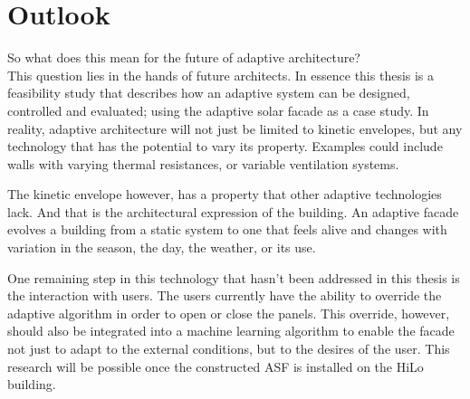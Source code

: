\section{Outlook}
\label{ch:mainoutlook}

So what does this mean for the future of adaptive architecture? \\

This question lies in the hands of future architects. In essence this thesis is a feasibility study that describes how an adaptive system can be designed, controlled and evaluated; using the adaptive solar facade as a case study. In reality, adaptive architecture will not just be limited to kinetic envelopes, but any technology that has the potential to vary its property. Examples could include walls with varying thermal resistances, or variable ventilation systems. 

The kinetic envelope however, has a property that other adaptive technologies lack. And that is the architectural expression of the building. An adaptive facade evolves a building from a static system to one that feels alive and changes with variation in the season, the day, the weather, or its use. 

One remaining step in this technology that hasn't been addressed in this thesis is the interaction with users. The users currently have the ability to override the adaptive algorithm in order to open or close the panels. This override, however, should also be integrated into a machine learning algorithm to enable the facade not just to adapt to the external conditions, but to the desires of the user. This research will be possible once the constructed ASF is installed on the HiLo building.


